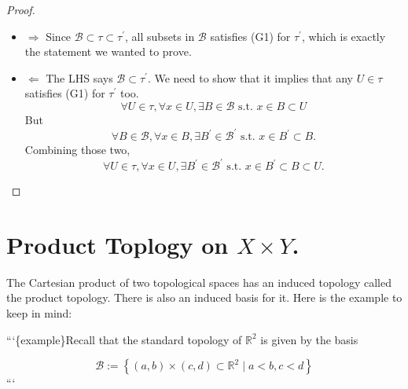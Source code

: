\documentclass[
]{book}
\theoremstyle{definition}
\theoremstyle{definition}
\theoremstyle{definition}
\theoremstyle{definition}
\theoremstyle{remark}
\begin{document}
\begin{proof}
\leavevmode

\begin{itemize}
\item
  \(\Rightarrow\) Since \(\mathcal{B} \subset \tau \subset \tau^{\prime}\), all subsets in \(\mathcal{B}\) satisfies (G1) for \(\tau^{\prime}\), which is exactly the statement we wanted to prove.
\item
  \(\Leftarrow\) The LHS says \(\mathcal{B} \subset \tau^{\prime}\). We need to show that it implies that any \(U \in \tau\) satisfies (G1) for \(\tau^{\prime}\) too.
  \[
  \forall U \in \tau, \forall x \in U, \exists B \in \mathcal{B} \text { s.t. } x \in B \subset U
  \]But\[
  \forall B \in \mathcal{B}, \forall x \in B, \exists B^{\prime} \in \mathcal{B}^{\prime} \text { s.t. } x \in B^{\prime} \subset B .
  \]
  Combining those two,
  \[
  \forall U \in \tau, \forall x \in U, \exists B^{\prime} \in \mathcal{B}^{\prime} \text { s.t. } x \in B^{\prime} \subset B \subset U .
  \]
\end{itemize}

\end{proof}

\hypertarget{product-toplogy-on-x-times-y.}{%
\section{\texorpdfstring{Product Toplogy on \(X \times Y\).}{Product Toplogy on X \textbackslash times Y.}}\label{product-toplogy-on-x-times-y.}}

The Cartesian product of two topological spaces has an induced topology called the product topology. There is also an induced basis for it. Here is the example to keep in mind:

```\{example\}Recall that the standard topology of \(\mathbb{R}^{2}\) is given by the basis

\[
\mathcal{B}:=\left\{(a, b) \times(c, d) \subset \mathbb{R}^{2} \mid a<b, c<d\right\}
\]
```
\end{document}
